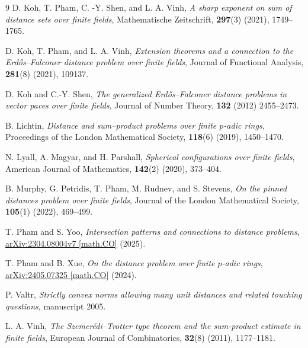 \documentclass{article}
\newcommand{\1}{\mathbf{1}}
\begin{document}
\begin{thebibliography}{9}
D. Koh, T. Pham, C. -Y. Shen, and L. A. Vinh, \textit{A sharp exponent on sum of distance sets over finite fields}, Mathematische Zeitschrift, \textbf{297}(3)  (2021), 1749--1765.

D. Koh, T. Pham, and L. A. Vinh, \textit{Extension theorems and a connection to the Erd\H{o}s--Falconer distance problem over finite fields}, Journal of Functional Analysis, \textbf{281}(8) (2021), 109137.


 D. Koh and C.-Y. Shen, \textit{The generalized Erd\H{o}s--Falconer distance problems in vector paces over finite fields}, Journal of Number Theory, \textbf{132} (2012) 2455--2473.

B. Lichtin, \textit{Distance and sum–product problems over finite $p$-adic rings}, Proceedings of the
London Mathematical Society, \textbf{118}(6) (2019), 1450--1470.


 N. Lyall, A. Magyar, and H. Parshall, \textit{Spherical configurations over finite fields}, American Journal of Mathematics, \textbf{142}(2) (2020), 373--404.


B. Murphy, G. Petridis, T. Pham, M. Rudnev, and S. Stevens, \textit{On the pinned distances problem over finite fields}, Journal of the London Mathematical Society, \textbf{105}(1) (2022), 469--499.


T. Pham and S. Yoo, \textit{Intersection patterns and connections to distance problems}, 
\href{https://arxiv.org/abs/2304.08004}
{arXiv:2304.08004v7 [math.CO]} (2025).


T. Pham and B. Xue, \textit{On the distance problem over finite $p$-adic rings}, 
\href{https://arxiv.org/abs/2405.07325}
{arXiv:2405.07325 [math.CO]} (2024).


 P. Valtr, \textit{Strictly convex norms allowing many unit distances and related touching questions}, manuscript 2005.

L. A. Vinh, \textit{The Szemer\'{e}di--Trotter type theorem and the sum-product estimate in finite fields}, European Journal of Combinatorics, \textbf{32}(8) (2011), 1177--1181.
\end{thebibliography}
\end{document}
